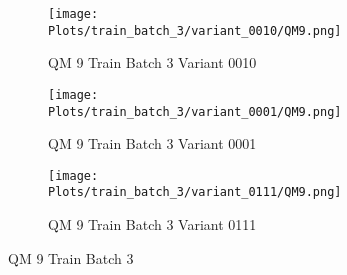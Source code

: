 \documentclass{DissertateFigs}
\begin{document}
\begin{figure}[t!]
\medskip

    \begin{subfigure}{0.47\textwidth}
    \texttt{[image: Plots/train\_batch\_3/variant\_0010/QM9.png]}
    \caption{QM 9 Train Batch 3 Variant 0010}
    \end{subfigure}
    \begin{subfigure}{0.47\textwidth}
    \texttt{[image: Plots/train\_batch\_3/variant\_0001/QM9.png]}
    \caption{QM 9 Train Batch 3 Variant 0001}
    \end{subfigure}

\medskip

    \begin{subfigure}{0.47\textwidth}
    \texttt{[image: Plots/train\_batch\_3/variant\_0111/QM9.png]}
    \caption{QM 9 Train Batch 3 Variant 0111}
    \end{subfigure}
\caption{QM 9 Train Batch 3}
    \end{figure}
\clearpage
\end{document}

